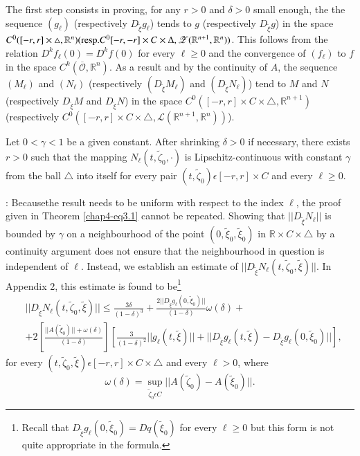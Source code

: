 The first step consists in proving, for any $r > 0$ and $\delta > 0$
small enough, the the sequence $(g_{\ell})$ (respectively
$D_{\widetilde{\xi}}g_{\ell}$) tends to $g$ (respectively
$D_{\widetilde{\xi}}g$) in the space $C^{0} ([-r, r] \times \triangle,
\mathbb{R}^{n}) (\text{resp.} C^0 [-r,-r] \times C \times
\Delta,\break
\mathscr{Z} (\mathbb{R}^{n+1}, \mathbb{R}^n))$. This follows from the relation $D^{k}f_{\ell}(0) =
D^{k}f(0)$ for every $\ell \geq 0$ and the convergence of $(f_{\ell})$
to $f$ in the space $C^{k}(\overline{\mathscr{O}}, \mathbb{R}^{n})$. As
a result and by the continuity of $A$, the sequence $(M_{\ell})$ and
$(N_{\ell})$ (respectively $(D_{\widetilde{\xi}}M_{\ell})$ and
$(D_{\widetilde{\xi}}N_{\ell})$) tend to $M$ and $N$ (respectively
$D_{\widetilde{\xi}}M$ and $D_{\widetilde{\xi}}N$) in the space
$C^{0}([-r, r] \times C \times \triangle, \mathbb{R}^{n+1})$
(respectively $C^{0}([-r, r] \times C \times \triangle,
\mathscr{L}(\mathbb{R}^{n+1} , \mathbb{R}^{n}))$).

\begin{theorem}\label{chap4-thm5.1}
Let $0 < \gamma < 1$ be a given constant. After shrinking $\delta > 0$
if necessary, there exists $r > 0$ such that the mapping $N_{\ell}(t,
\widetilde{\zeta}_{0}, \cdot)$ is Lipschitz-continuous with constant
$\gamma$ from the ball $\triangle$ into itself for every pair $(t,
\widetilde{\zeta}_{0}) \epsilon [-r, r] \times C$ and every $\ell \geq
0$.
\end{theorem} 

\medskip
{}: Because\pageoriginale the
result needs to be uniform with respect to the index $\ell$, the proof
given in Theorem \ref{chap4-eq3.1} cannot be repeated. Showing that
$||D_{\widetilde{\xi}}N_{\ell}||$ is bounded by $\gamma$ on a
neighbourhood of the point $(0, \widetilde{\xi}_{0},
\widetilde{\xi}_{0})$ in $\mathbb{R} \times C \times \triangle$ by a
continuity argument does not ensure that the neighbourhood in question
is independent of $\ell$. Instead, we establish an estimate of
$||D_{\widetilde{\xi}}N_{\ell}(t, \widetilde{\zeta}_{0},
\widetilde{\xi})||$. In Appendix 2, this estimate is found to
be\footnote{Recall that $D_{\widetilde{\xi}}g_{\ell}(0,
  \widetilde{\xi}_{0}) = Dq(\widetilde{\xi}_{0})$ for every $\ell \geq
  0$ but this form is not quite appropriate in the formula.}
\begin{align*}
& ||D_{\widetilde{\xi}}N_{\ell}(t, \widetilde{\zeta}_{0},
\widetilde{\xi})|| \leq \frac{3\delta}{(1 - \delta)^{3}} +
\frac{2||D_{\widetilde{\xi}}g_{\ell}(0, \widetilde{\xi}_{0})||}{(1 -
  \delta)} \omega(\delta) + \\
& + 2\left[\frac{||A(\widetilde{\xi}_{0})|| + \omega(\delta)}{(1 -
    \delta)}\right] \left[\frac{3}{(1 - \delta)^{2}} ||g_{\ell}(t,
  \widetilde{\xi})|| + ||D_{\widetilde{\xi}}g_{\ell}(t,
  \widetilde{\xi}) - D_{\widetilde{\xi}}g_{\ell}(0, \widetilde{\xi}_{0})||\right],
\end{align*}
for every $(t, \widetilde{\zeta}_{0}, \widetilde{\xi}) \epsilon [-r,
  r] \times C \times \triangle$ and every $\ell > 0$, where
$$
\omega(\delta) = \sup_{\widetilde{\zeta}_{0} \epsilon C}
||A(\widetilde{\zeta}_{0}) - A(\widetilde{\xi}_{0})||.
$$

